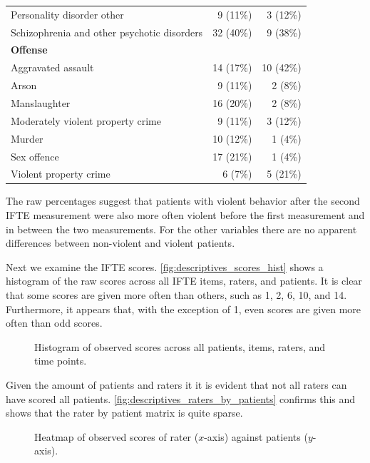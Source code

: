 \documentclass[a4paper,11pt]{article}
\begin{document}
\begin{table}[!ht]
\begin{tabular}{lrr}
\hspace{3mm} Personality disorder other 	 & 9 (11\%) & 3 (12\%) \\
\hspace{3mm} Schizophrenia and other psychotic disorders 	 & 32 (40\%) & 9 (38\%) \\
\textbf{Offense}		  &&\\
\hspace{3mm} Aggravated assault 	 & 14 (17\%) & 10 (42\%) \\
\hspace{3mm} Arson 	 & 9 (11\%) & 2 (8\%) \\
\hspace{3mm} Manslaughter 	 & 16 (20\%) & 2 (8\%) \\
\hspace{3mm} Moderately violent property crime 	 & 9 (11\%) & 3 (12\%) \\
\hspace{3mm} Murder 	 & 10 (12\%) & 1 (4\%) \\
\hspace{3mm} Sex offence 	 & 17 (21\%) & 1 (4\%) \\
\hspace{3mm} Violent property crime 	 & 6 (7\%) & 5 (21\%) \\
        \bottomrule
    \end{tabular}
\end{table}
The raw percentages suggest that patients with violent behavior after the second IFTE measurement were also more often violent before the first measurement and in between the two measurements.
For the other variables there are no apparent differences between non-violent and violent patients.

Next we examine the IFTE scores. 
\autoref{fig:descriptives_scores_hist} shows a histogram of the raw scores across all IFTE items, raters, and patients.
It is clear that some scores are given more often than others, such as 1, 2, 6, 10, and 14.
Furthermore, it appears that, with the exception of 1, even scores are given more often than odd scores.
\begin{figure}[!ht]
	\centering
	
	\caption{Histogram of observed scores across all patients, items, raters, and time points.}
	\label{fig:descriptives_scores_hist}
\end{figure}
Given the amount of patients and raters it it is evident that not all raters can have scored all patients.
\autoref{fig:descriptives_raters_by_patients} confirms this and shows that the rater by patient matrix is quite sparse.
\begin{figure}[!ht]
	\centering
	
	\caption{Heatmap of observed scores of rater ($x$-axis) against patients ($y$-axis).}
	\label{fig:descriptives_raters_by_patients}
\end{figure}
\end{document}
